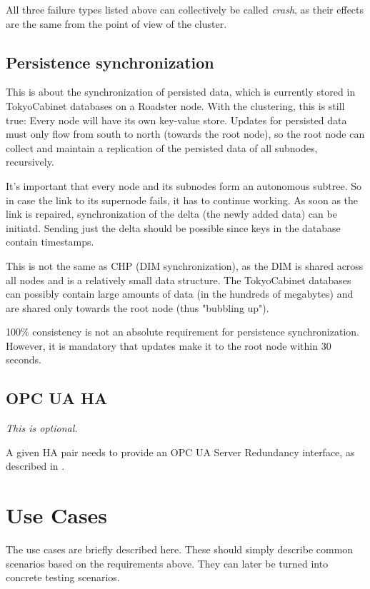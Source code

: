 All three failure types listed above can collectively be called \emph{crash},
as their effects are the same from the point of view of the cluster.

\subsection{Persistence synchronization}
This is about the synchronization of persisted data, which is currently stored
in TokyoCabinet databases on a Roadster node. With the clustering, this is
still true: Every node will have its own key-value store. Updates for persisted
data must only flow from south to north (towards the root node), so the root
node can collect and maintain a replication of the persisted data of all
subnodes, recursively.

It's important that every node and its subnodes form an autonomous subtree. So
in case the link to its supernode fails, it has to continue working. As soon as
the link is repaired, synchronization of the delta (the newly added data) can
be initiatd. Sending just the delta should be possible since keys in the
database contain timestamps.

This is not the same as \gls{CHP} (\gls{DIM} synchronization), as the DIM is shared across
all nodes and is a relatively small data structure. The TokyoCabinet databases
can possibly contain large amounts of data (in the hundreds of megabytes) and
are shared only towards the root node (thus "bubbling up").

100\% consistency is not an absolute requirement for persistence synchronization.
However, it is mandatory that updates make it to the root node within 30 seconds.

\subsection{OPC UA HA}
\emph{This is optional.}

A given \gls{HA} pair needs to provide an OPC UA Server Redundancy interface,
as described in \cite[6.4.2.4 Non-transparent Redundancy,
p.~96]{opc-ua:behavior:server-redundancy}.

\section{Use Cases}
The use cases are briefly described here. These should simply describe common
scenarios based on the requirements above. They can later be turned into
concrete testing scenarios.

